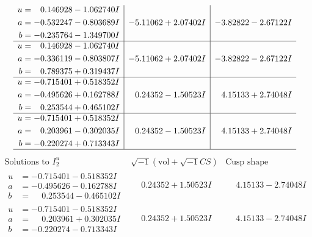 \documentclass[1p]{elsarticle_modified}
\theoremstyle{definition}
\newcommand{\I}{\sqrt{-1}}
\begin{document}
$$\begin{array}{c|c|c}
\begin{aligned}
u &= \phantom{-}0.146928 - 1.062740 I \\
a &= -0.532247 - 0.803689 I \\
b &= -0.235764 - 1.349700 I\end{aligned}
 & -5.11062 + 2.07402 I & -3.82822 - 2.67122 I \\ \hline\begin{aligned}
u &= \phantom{-}0.146928 - 1.062740 I \\
a &= -0.336119 - 0.803807 I \\
b &= \phantom{-}0.789375 + 0.319437 I\end{aligned}
 & -5.11062 + 2.07402 I & -3.82822 - 2.67122 I \\ \hline\begin{aligned}
u &= -0.715401 + 0.518352 I \\
a &= -0.495626 + 0.162788 I \\
b &= \phantom{-}0.253544 + 0.465102 I\end{aligned}
 & \phantom{-}0.24352 - 1.50523 I & \phantom{-}4.15133 + 2.74048 I \\ \hline\begin{aligned}
u &= -0.715401 + 0.518352 I \\
a &= \phantom{-}0.203961 - 0.302035 I \\
b &= -0.220274 + 0.713343 I\end{aligned}
 & \phantom{-}0.24352 - 1.50523 I & \phantom{-}4.15133 + 2.74048 I\\
 \hline 
 \end{array}$$\newpage$$\begin{array}{c|c|c}  
\text{Solutions to }I^u_{2}& \I (\text{vol} + \sqrt{-1}CS) & \text{Cusp shape}\\
 \hline 
\begin{aligned}
u &= -0.715401 - 0.518352 I \\
a &= -0.495626 - 0.162788 I \\
b &= \phantom{-}0.253544 - 0.465102 I\end{aligned}
 & \phantom{-}0.24352 + 1.50523 I & \phantom{-}4.15133 - 2.74048 I \\ \hline\begin{aligned}
u &= -0.715401 - 0.518352 I \\
a &= \phantom{-}0.203961 + 0.302035 I \\
b &= -0.220274 - 0.713343 I\end{aligned}
 & \phantom{-}0.24352 + 1.50523 I & \phantom{-}4.15133 - 2.74048 I \\ \hline\begin{aligned}

\end{aligned}
\end{array}$$
\end{document}
